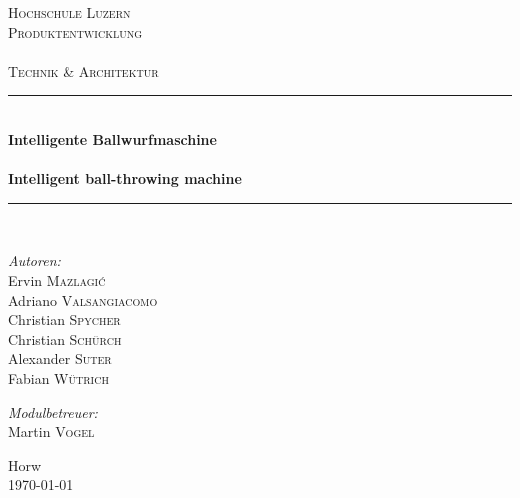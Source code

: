 \begin{titlepage}

\begin{center}

\textsc{\LARGE Hochschule Luzern}\\[1.5cm]

\textsc{\Large Produktentwicklung\\
    ~\\
    Technik \& Architektur}\\[0.5cm]

\vfill{}

\newcommand{\HRule}{\rule{\linewidth}{0.5mm}}
\HRule \\[0.4cm]
{   \Huge \bfseries Intelligente Ballwurfmaschine\\
        ~\\
        \large Intelligent ball-throwing machine}\\[0.4cm]

\HRule \\[1.5cm]

\begin{minipage}{0.4\textwidth}
    \begin{flushleft} \large
        \emph{Autoren:}\\
        Ervin \textsc{Mazlagi\'c}\\
        Adriano \textsc{Valsangiacomo}\\
        Christian \textsc{Spycher}\\
        Christian \textsc{Schürch}\\
        Alexander \textsc{Suter}\\
        Fabian \textsc{Wütrich}\\
    \end{flushleft}
\end{minipage}
\hfill
\begin{minipage}{0.4\textwidth}
    \begin{flushright} \large
        \emph{Modulbetreuer:} \\
        Martin \textsc{Vogel}
    \end{flushright}
\end{minipage}

\vfill{}
\vfill{}
\vfill{}

{\large Horw\\ \today}

\end{center}

\end{titlepage}
